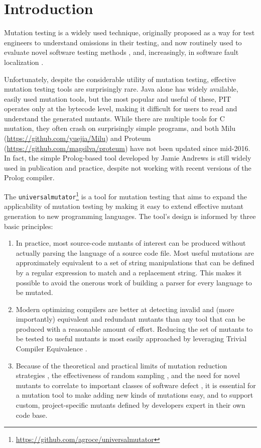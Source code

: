 \section{Introduction}

Mutation testing \cite{PracProg,Mut2000} is a widely used technique,
originally proposed as a way for test engineers to understand
omissions in their testing, and now routinely used to evaluate
novel software testing methods \cite{ISSTA13,ahmed_testedness}, and, increasingly, in software
fault localization \cite{Metallaxis,multilingual,TransProgTest}.

Unfortunately, despite the considerable utility of mutation testing,
effective mutation testing tools are surprisingly rare.  Java alone
has widely available, easily used mutation tools, but the most popular
and useful of these, PIT \cite{pittest} operates only at the bytecode
level, making it difficult for users to read and understand the
generated mutants.  While there are multiple tools for C mutation,
they often crash on surprisingly simple programs, and both Milu
(\url{https://github.com/yuejia/Milu}) and Proteum
(\url{https://github.com/magsilva/proteum}) have not been updated
since mid-2016.  In fact, the simple Prolog-based tool developed by
Jamie Andrews \cite{mutant} is still widely used in publication and
practice, despite not working with recent versions of the Prolog compiler.

The {\tt universalmutator}\footnote{\url{https://github.com/agroce/universalmutator}} is a tool for
mutation testing \cite{PracProg,Mut2000} that aims to expand the
applicability of mutation testing by making it easy to extend
effective mutant generation to new programming languages.
The tool's design is informed by three basic principles:

\begin{enumerate}
\item In practice, most source-code mutants of interest can be
  produced without actually parsing the language of a source code
  file.  Most useful mutations are approximately equivalent to a
  set of string manipulations that can be defined by a regular
  expression to match and a replacement string.  This makes it
  possible to avoid the onerous work of building a parser for every
  language to be mutated.
\item Modern optimizing compilers are better at detecting invalid and
  (more importantly) equivalent and redundant mutants than any tool
  that can be produced with a reasonable amount of effort.  Reducing
  the set of mutants to be tested to useful mutants is most easily
  approached by leveraging Trivial Compiler Equivalence \cite{TCE}.
\item Because of the theoretical and practical limits of mutation
  reduction strategies \cite{Gopinath1,Gopinath2}, the
  effectiveness of random sampling \cite{Gopinath3}, and the need for
  novel mutants to correlate to important classes of software defect
  \cite{Just2014mutants}, it is essential for a mutation tool to make adding new
  kinds of mutations easy, and to support custom, project-specific
  mutants defined by developers expert in their own code base.
\end{enumerate}

